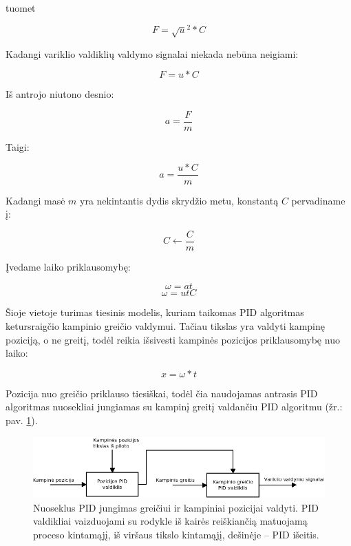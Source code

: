 \documentclass[12pt, a4paper, lithuanian, final]{article}
\begin{document}
tuomet

\begin{equation}
	F = \sqrt{u}^2 * C
\end{equation}

Kadangi variklio valdiklių valdymo signalai niekada nebūna neigiami:

\begin{equation}
	F = u * C
\end{equation}

Iš antrojo niutono desnio:

\begin{equation}
	a = \dfrac{F}{m}
\end{equation}

Taigi:

\begin{equation}
	a = \dfrac{u * C}{m}
\end{equation}

Kadangi masė $m$ yra nekintantis dydis skrydžio metu, konstantą $C$ pervadiname į:

\begin{equation}
	C \leftarrow \dfrac{C}{m}
\end{equation}

Įvedame laiko priklausomybę:

\begin{equation}
	\omega = at
\end{equation}
\begin{equation}
	\omega = utC
\end{equation}

Šioje vietoje turimas tiesinis modelis, kuriam taikomas PID algoritmas ketursraigčio kampinio greičio valdymui.
Tačiau tikslas yra valdyti kampinę poziciją, o ne greitį, todėl reikia išsivesti kampinės pozicijos priklausomybę nuo laiko:

\begin{equation}
	x =  \omega * t
\end{equation}

Pozicija nuo greičio priklauso tiesiškai, todėl čia naudojamas antrasis PID algoritmas nuosekliai jungiamas su kampinį greitį valdančiu PID algoritmu (žr.: pav. \ref{pav-PID-series}).

\begin{figure}[H]
\begin{center}
\includegraphics[width=1.0\textwidth]{img/PID-chaining.png}
\caption{Nuoseklus PID jungimas greičiui ir kampiniai pozicijai valdyti. PID valdikliai vaizduojami su rodykle iš kairės reiškiančią matuojamą proceso kintamąjį, iš viršaus tikslo kintamąjį, dešinėje -- PID išeitis.}
\label{pav-PID-series}
\end{center}
\end{figure}
\end{document}
